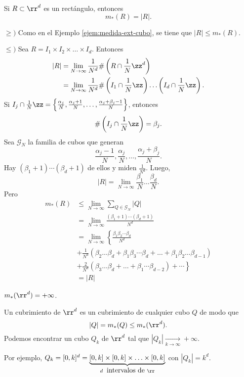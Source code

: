   \begin{ejemplo}{}
  Si $R\subset \rr^d$ es un rect\'angulo, entonces \[m_{*}(R)=|R|.\]
  
  $\geq)$
  Como en el Ejemplo \ref{ejem:medida-ext-cubo}, se tiene que 
  $|R|\leq m_{*}(R)$.
  
  $\leq)$ Sea $R=I_1\times I_2\times\ldots \times I_d$. Entonces
  \[
  \begin{split}
  |R|&=\lim\limits_{N\to \infty}
  \frac{1}{N^d} \#\left(R \cap \frac{1}{N}\zz^d \right)
  \\
  &=\lim\limits_{N\to \infty}
  \frac{1}{N^d} \#\left(I_1 \cap \frac{1}{N}\zz \right)\ldots 
  \left(I_d \cap \frac{1}{N}\zz \right).
  \end{split}
  \]
  Si $I_j\cap \frac{1}{N}\zz=
  \left\{
  \frac{\alpha_j}{N},\frac{\alpha_j+1}{N},
  \ldots, \frac{\alpha_j+\beta_j-1}{N}
  \right\}$, entonces
  \[
  \#\left( I_j \cap \frac{1}{N} \zz \right)=\beta_j.
    \]
    Sea $\mathscr{G}_N$ la familia de cubos que generan
    \[
    \frac{\alpha_j-1}{N},\frac{\alpha_j}{N},\ldots,\frac{\alpha_j+\beta_j}{N}.
    \]
  Hay $(\beta_1+1)\cdots (\beta_d+1)$ de ellos y miden $\frac{1}{N^d}$.
  Luego, 
  \[
  |R|=\lim\limits_{N\to \infty} \frac{\beta_1}{N}\ldots \frac{\beta_d}{N}.
  \]
  Pero
  \[
  \begin{split}
  m_{*}(R)
  &\leq 
  \lim\limits_{N\to \infty} \sum\limits_{Q \in \mathscr{G}_N} |Q|
  \\
  &=\lim\limits_{N \to \infty} \frac{(\beta_1+1)\cdots (\beta_d+1)}{N^d}
  \\
  &=
  \lim\limits_{N \to \infty}
  \left\{ 
  \frac{\beta_1\beta_2\cdots\beta_d}{N^d}
  \right.
  \\
  &+\frac{1}{N^d}(\beta_2\ldots\beta_d+\beta_1\beta_3\cdots\beta_d+\ldots+\beta_1\beta_2\ldots\beta_{d-1})
  \\
  &+\left.
  \frac{2}{N^d}(\beta_3\ldots \beta_d+\ldots+\beta_1\cdots\beta_{d-2})+\cdots \right\} 
  \\
  &=|R|
  \end{split}
  \]
  \end{ejemplo}
  
  \begin{ejemplo}{}
  $m_{*}(\rr^d)=+\infty$.
  
  Un cubrimiento de $\rr^d$ es un cubrimiento de cualquier cubo $Q$ de modo que 
  \[
  |Q|=m_{*}(Q)\leq m_{*}(\rr^d).
  \]
  Podemos encontrar un cubo $Q_k$ de $\rr^d$ tal que $|Q_k|\xrightarrow[k \to \infty]{} +\infty$.
  
  Por ejemplo, $Q_k=[0,k]^d=
  \underbrace{[0,k]\times[0,k]\times \ldots \times [0,k]}_{d\;\mbox{ intervalos de }\rr}$ con $|Q_k|=k^d$.
    \end{ejemplo}
    
